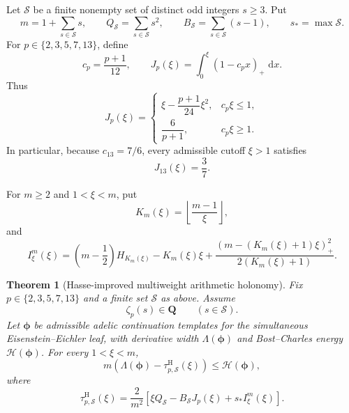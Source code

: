 \documentclass[11pt]{article}
\newtheorem{theorem}{Theorem}[section]
\theoremstyle{definition}
\theoremstyle{remark}
\newcommand{\Q}{\mathbf Q}
\newcommand{\dd}{\,\mathrm d}
\newcommand{\Energy}{\mathscr H}
\newcommand{\LambdaAH}{\Lambda}
\newcommand{\floor}[1]{\left\lfloor #1\right\rfloor}
\newcommand{\positivepart}[1]{\left(#1\right)_+}
\begin{document}
Let $\mathcal S$ be a finite nonempty set of distinct odd integers $s\ge3$.
Put
\begin{equation}\label{eq:packet-data}
 m=1+\sum_{s\in\mathcal S}s,
 \qquad Q_{\mathcal S}=\sum_{s\in\mathcal S}s^2,
 \qquad B_{\mathcal S}=\sum_{s\in\mathcal S}(s-1),
 \qquad s_*=\max\mathcal S.
\end{equation}
For $p\in\{2,3,5,7,13\}$, define
\begin{equation}\label{eq:Jp}
 c_p=\frac{p+1}{12},
 \qquad
 J_p(\xi)=\int_0^\xi(1-c_px)_+\,\dd x.
\end{equation}
Thus
\[
 J_p(\xi)=
 \begin{cases}
 \xi-\dfrac{p+1}{24}\xi^2,&c_p\xi\le1,\\[2mm]
 \dfrac{6}{p+1},&c_p\xi\ge1.
 \end{cases}
\]
In particular, because $c_{13}=7/6$, every admissible cutoff $\xi>1$ satisfies
\begin{equation}\label{eq:J13}
 J_{13}(\xi)=\frac37.
\end{equation}

For $m\ge2$ and $1<\xi<m$, put
\begin{equation}\label{eq:I-def}
 K_m(\xi)=\floor{\frac{m-1}{\xi}},
\end{equation}
and
\begin{equation}\label{eq:I}
 I^m_\xi(\xi)=
 \left(m-\frac12\right)H_{K_m(\xi)}-K_m(\xi)\xi
 +\frac{\positivepart{m-(K_m(\xi)+1)\xi}^2}{2(K_m(\xi)+1)}.
\end{equation}

\begin{theorem}[Hasse-improved multiweight arithmetic holonomy]
\label{thm:multiweight}
Fix $p\in\{2,3,5,7,13\}$ and a finite set $\mathcal S$ as above.  Assume
\[
 \zeta_p(s)\in\Q\qquad(s\in\mathcal S).
\]
Let $\boldsymbol\phi$ be admissible adelic continuation templates for the
simultaneous Eisenstein--Eichler leaf, with derivative width
$\LambdaAH(\boldsymbol\phi)$ and Bost--Charles energy
$\Energy(\boldsymbol\phi)$.  For every $1<\xi<m$,
\begin{equation}\label{eq:multiweight-holonomy}
 m\left(\LambdaAH(\boldsymbol\phi)
 -\tau^{\mathrm H}_{p,\mathcal S}(\xi)\right)
 \le\Energy(\boldsymbol\phi),
\end{equation}
where
\begin{equation}\label{eq:tau-rect}
 \boxed{
 \tau^{\mathrm H}_{p,\mathcal S}(\xi)
 =\frac{2}{m^2}\left[
 \xi Q_{\mathcal S}-B_{\mathcal S}J_p(\xi)
 +s_*I^m_\xi(\xi)
 \right].}
\end{equation}
\end{theorem}
\end{document}
